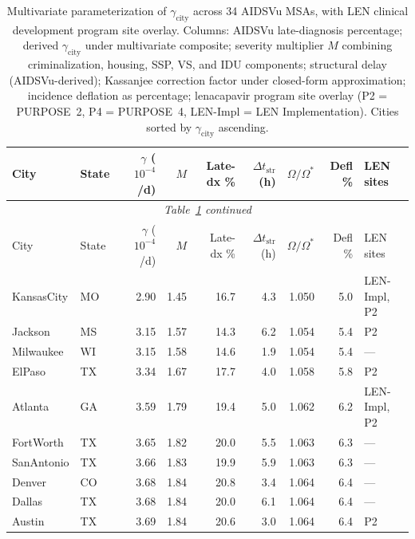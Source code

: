 \documentclass[11pt]{article}
\begin{document}
\setlength{\LTleft}{0pt}
\setlength{\LTright}{0pt}
\setlength{\LTcapwidth}{\textwidth}
\setlength{\tabcolsep}{3pt}
\renewcommand{\arraystretch}{0.95}
\scriptsize
\begin{longtable}{@{}llrrrrrrl@{}}
\caption[Multivariate $\gamma_{\mathrm{city}}$ table]{Multivariate parameterization of $\gamma_{\mathrm{city}}$ across 34 AIDSVu MSAs, with LEN clinical development program site overlay. Columns: AIDSVu late-diagnosis percentage; derived $\gamma_{\mathrm{city}}$ under multivariate composite; severity multiplier $M$ combining criminalization, housing, SSP, VS, and IDU components; structural delay (AIDSVu-derived); Kassanjee correction factor under closed-form approximation; incidence deflation as percentage; lenacapavir program site overlay (P2 = PURPOSE~2, P4 = PURPOSE~4, LEN-Impl = LEN Implementation). Cities sorted by $\gamma_{\mathrm{city}}$ ascending.}
\label{tab:gamma_multivariate} \\
\toprule
City & State & $\gamma$ ($10^{-4}$/d) & $M$ & Late-dx \% & $\Delta t_{\mathrm{str}}$ (h) & $\Omega/\Omega^*$ & Defl \% & LEN sites \\
\midrule
\endfirsthead
\multicolumn{9}{c}{\textit{Table~\ref{tab:gamma_multivariate} continued}} \\
\toprule
City & State & $\gamma$ ($10^{-4}$/d) & $M$ & Late-dx \% & $\Delta t_{\mathrm{str}}$ (h) & $\Omega/\Omega^*$ & Defl \% & LEN sites \\
\midrule
\endhead
\bottomrule
\endfoot
KansasCity & MO & 2.90 & 1.45 & 16.7 & 4.3 & 1.050 & 5.0 & LEN-Impl, P2 \\
Jackson & MS & 3.15 & 1.57 & 14.3 & 6.2 & 1.054 & 5.4 & P2 \\
Milwaukee & WI & 3.15 & 1.58 & 14.6 & 1.9 & 1.054 & 5.4 & --- \\
ElPaso & TX & 3.34 & 1.67 & 17.7 & 4.0 & 1.058 & 5.8 & P2 \\
Atlanta & GA & 3.59 & 1.79 & 19.4 & 5.0 & 1.062 & 6.2 & LEN-Impl, P2 \\
FortWorth & TX & 3.65 & 1.82 & 20.0 & 5.5 & 1.063 & 6.3 & --- \\
SanAntonio & TX & 3.66 & 1.83 & 19.9 & 5.9 & 1.063 & 6.3 & --- \\
Denver & CO & 3.68 & 1.84 & 20.8 & 3.4 & 1.064 & 6.4 & --- \\
Dallas & TX & 3.68 & 1.84 & 20.0 & 6.1 & 1.064 & 6.4 & --- \\
Austin & TX & 3.69 & 1.84 & 20.6 & 3.0 & 1.064 & 6.4 & P2 \\

\end{longtable}
\end{document}
